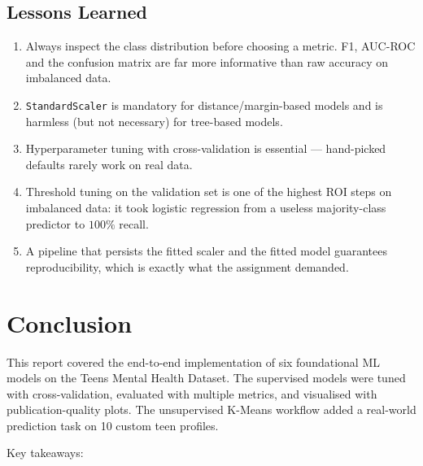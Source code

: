\documentclass[11pt,a4paper]{article}
\begin{document}
\subsection{Lessons Learned}
\begin{enumerate}[leftmargin=*, itemsep=2pt]
    \item Always inspect the class distribution before choosing a metric.
        F1, AUC-ROC and the confusion matrix are far more informative
        than raw accuracy on imbalanced data.
    \item \texttt{StandardScaler} is mandatory for distance/margin-based
        models and is harmless (but not necessary) for tree-based models.
    \item Hyperparameter tuning with cross-validation is essential —
        hand-picked defaults rarely work on real data.
    \item Threshold tuning on the validation set is one of the highest
        ROI steps on imbalanced data: it took logistic regression from
        a useless majority-class predictor to $100\%$ recall.
    \item A pipeline that persists the fitted scaler and the fitted model
        guarantees reproducibility, which is exactly what the assignment
        demanded.
\end{enumerate}

\newpage
\section{Conclusion}

This report covered the end-to-end implementation of six foundational ML
models on the Teens Mental Health Dataset. The supervised models were
tuned with cross-validation, evaluated with multiple metrics, and
visualised with publication-quality plots. The unsupervised K-Means
workflow added a real-world prediction task on 10 custom teen profiles.

Key takeaways:
\end{document}
